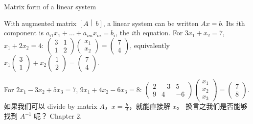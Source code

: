 \begin{theorem}{Matrix form of a linear system}

With augmented matrix \(\left\lbrack A \middle| \ b \right\rbrack\), a linear system can be written \(Ax = b\). Its \(i\)th component is \(a_{i1}x_{1} + \ldots + a_{im}x_{m} = b_{i}\), the \(i\)th equation. For \(3x_{1} + x_{2} = 7\), \(x_{1} + 2x_{2} = 4\): \(\begin{pmatrix}
3 & 1 \\
1 & 2
\end{pmatrix}\begin{pmatrix}
x_{1} \\
x_{2}
\end{pmatrix} = \begin{pmatrix}
7 \\
4
\end{pmatrix}\), equivalently \(x_{1}\begin{pmatrix}
3 \\
1
\end{pmatrix} + x_{2}\begin{pmatrix}
1 \\
2
\end{pmatrix} = \begin{pmatrix}
7 \\
4
\end{pmatrix}\).

For \(2x_{1} - 3x_{2} + 5x_{3} = 7\), \(9x_{1} + 4x_{2} - 6x_{3} = 8\): \(\begin{pmatrix}
2 & {- 3} & 5 \\
9 & 4 & {- 6}
\end{pmatrix}\begin{pmatrix}
x_{1} \\
x_{2} \\
x_{3}
\end{pmatrix} = \begin{pmatrix}
7 \\
8
\end{pmatrix}\). 如果我们可以 divide by matrix \(A\)，\(x = \frac{b}{A}\)，就能直接解 \(x\)。 换言之我们是否能够找到 \(A^{- 1}\) 呢？ Chapter 2.

\end{theorem}
